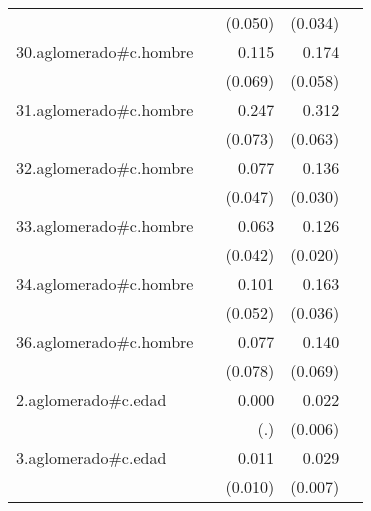 {\begin{longtable}{l*{4}{D{.}{.}{-1}}}
            &                     &     (0.050)         &     (0.034)         &                     \\
\addlinespace
30.aglomerado#c.hombre&                     &       0.115         &       0.174\sym{**} &                     \\
            &                     &     (0.069)         &     (0.058)         &                     \\
\addlinespace
31.aglomerado#c.hombre&                     &       0.247\sym{***}&       0.312\sym{***}&                     \\
            &                     &     (0.073)         &     (0.063)         &                     \\
\addlinespace
32.aglomerado#c.hombre&                     &       0.077         &       0.136\sym{***}&                     \\
            &                     &     (0.047)         &     (0.030)         &                     \\
\addlinespace
33.aglomerado#c.hombre&                     &       0.063         &       0.126\sym{***}&                     \\
            &                     &     (0.042)         &     (0.020)         &                     \\
\addlinespace
34.aglomerado#c.hombre&                     &       0.101         &       0.163\sym{***}&                     \\
            &                     &     (0.052)         &     (0.036)         &                     \\
\addlinespace
36.aglomerado#c.hombre&                     &       0.077         &       0.140\sym{*}  &                     \\
            &                     &     (0.078)         &     (0.069)         &                     \\
\addlinespace
2.aglomerado#c.edad&                     &       0.000         &       0.022\sym{***}&                     \\
            &                     &         (.)         &     (0.006)         &                     \\
\addlinespace
3.aglomerado#c.edad&                     &       0.011         &       0.029\sym{***}&                     \\
            &                     &     (0.010)         &     (0.007)         &                     \\

\end{longtable}}

